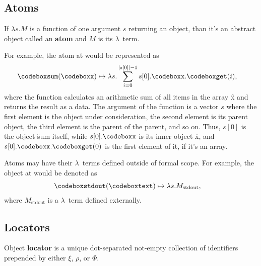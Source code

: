 \subsection{Atoms}

\begin{eodefinition}\label{def:atom}
If $\lambda s.M$ is a function of one argument $s$ returning an object,
than it's an abstract object called an \textbf{atom} and $M$ is its $\lambda$~term.
\end{eodefinition}

For example, the atom at  would be represented as
\begin{equation}
\begin{split}
& \f{sum}(\f{x}) \mapsto \lambda s . \sum\limits_{i=0}^{|s[0]| - 1} s[0].\f{x}.\f{get}(i),
\end{split}
\end{equation}
where the function calculates an arithmetic sum of all items
in the array \f{x} and returns the result as a data. The argument of
the function is a vector $s$ where the first element is the object under
consideration, the second element is its parent object, the third element
is the parent of the parent, and so on. Thus, $s[0]$ is the object
\f{sum} itself, while $s[0].\f{x}$ is its inner object \f{x},
and $s[0].\f{x}.\f{get}(0)$ is the first element of it, if it's an array.

Atoms may have their $\lambda$~terms defined outside of \phic{} formal scope.
For example, the object at  would be denoted as
\begin{equation}
\begin{split}
& \f{stdout}(\f{text}) \mapsto \lambda s.M_\text{stdout},
\end{split}
\end{equation}
where $M_\text{stdout}$ is a $\lambda$~term defined externally.

\subsection{Locators}

\begin{eodefinition}\label{def:locator}
Object \textbf{locator} is a unique dot-separated not-empty
collection of identifiers prepended by either $\xi$, $\rho$, or $\Phi$.
\end{eodefinition}

